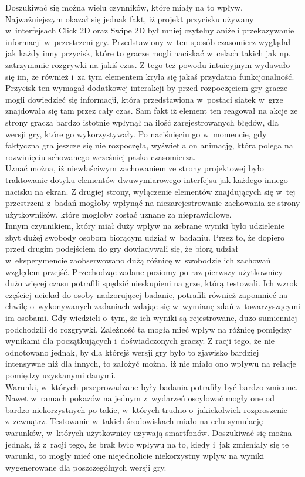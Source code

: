 \documentclass[a4paper,12pt,numbers=noenddot]{report}
\begin{document}
Doszukiwać się można wielu czynników, które miały na to wpływ. Najważniejszym okazał się jednak fakt, iż projekt przycisku używany w~interfejsach Click 2D oraz Swipe 2D był mniej czytelny aniżeli przekazywanie informacji w~przestrzeni gry. Przedstawiony w~ten sposób czasomierz wyglądał jak każdy inny przycisk, które to gracze mogli naciskać w~celach takich jak np. zatrzymanie rozgrywki na jakiś czas. Z tego też powodu intuicyjnym wydawało się im, że również i~za tym elementem kryła się jakaś przydatna funkcjonalność.
Przycisk ten wymagał dodatkowej interakcji by przed rozpoczęciem gry gracze mogli dowiedzieć się informacji, która przedstawiona w~postaci siatek w~grze znajdowała się tam przez cały czas. Sam fakt iż element ten reagował na akcje ze strony gracza bardzo istotnie wpłynął na ilość zarejestrowanych błędów, dla wersji gry, które go wykorzystywały. Po naciśnięciu go w~momencie, gdy faktyczna gra jeszcze się nie rozpoczęła, wyświetla on animację, która polega na rozwinięciu schowanego wcześniej paska czasomierza. \\
Uznać można, iż niewłaściwym zachowaniem ze strony projektowej było traktowanie dotyku elementów dwuwymiarowego interfejsu jak każdego innego nacisku na ekran. Z drugiej strony, wyłączenie elementów znajdujących się w~tej przestrzeni z~badań mogłoby wpłynąć na niezarejestrowanie zachowania ze strony użytkowników, które mogłoby zostać uznane za nieprawidłowe.\\
Innym czynnikiem, który miał duży wpływ na zebrane wyniki było udzielenie zbyt dużej swobody osobom biorącym udział w~badaniu. Przez to, że dopiero przed drugim podejściem do gry dowiadywali się, że biorą udział w~eksperymencie zaobserwowano dużą różnicę w~swobodzie ich zachowań względem przejść. Przechodząc zadane poziomy po raz pierwszy użytkownicy dużo więcej czasu potrafili spędzić nieskupieni na grze, którą testowali. Ich wzrok częściej uciekał do osoby nadzorującej badanie, potrafili również zapomnieć na chwilę o~wykonywanych zadaniach wdając się w~wymianę zdań z~towarzyszącymi im osobami. Gdy wiedzieli o~tym, że ich wyniki są rejestrowane, dużo sumienniej podchodzili do rozgrywki. Zależność ta mogła mieć wpływ na różnicę pomiędzy wynikami dla początkujących i~doświadczonych graczy. Z racji tego, że nie odnotowano jednak, by dla którejś wersji gry było to zjawisko bardziej intensywne niż dla innych, to założyć można, iż nie miało ono wpływu na relacje pomiędzy uzyskanymi danymi.\\
Warunki, w~których przeprowadzane były badania potrafiły być bardzo zmienne. Nawet w~ramach pokazów na jednym z~wydarzeń oscylować mogły one od bardzo niekorzystnych po takie, w~których trudno o~jakiekolwiek rozproszenie z~zewnątrz. Testowanie w~takich środowiskach miało na celu symulację warunków, w~których użytkownicy używają smartfonów. Doszukiwać się można jednak, iż z~racji tego, że brak było wpływu na to, kiedy i~jak zmieniały się te warunki, to mogły mieć one niejednolicie niekorzystny wpływ na wyniki wygenerowane dla poszczególnych wersji gry.\\
\end{document}
